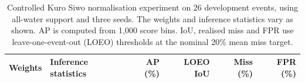 \begin{table}[pos=t]
\caption{Controlled Kuro Siwo normalisation experiment on 26 development events, using all-water support and three seeds. The weights and inference statistics vary as shown. AP is computed from 1,000 score bins. IoU, realised miss and FPR use leave-one-event-out (LOEO) thresholds at the nominal 20\% mean miss target.}
\label{tab:norm_external}
\centering
\begin{tabular}{@{}llrrrr@{}}
\toprule
Weights & Inference statistics & AP (\%) & LOEO IoU & Miss (\%) & FPR (\%) \\
\midrule

\end{tabular}
\end{table}
